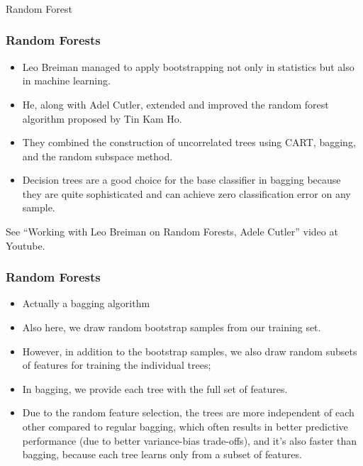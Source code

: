 \begin{frame}[fragile]\frametitle{}
\begin{center}
{\Large Random Forest}
\end{center}
\end{frame}


\begin{frame}[fragile]\frametitle{Random Forests}
\begin{itemize}
\item Leo Breiman managed to apply bootstrapping not only in statistics but also in machine learning. \item He, along with Adel Cutler, extended and improved the random forest algorithm proposed by Tin Kam Ho. 
\item They combined the construction of uncorrelated trees using CART, bagging, and the random subspace method.
\item Decision trees are a good choice for the base classifier in bagging because they are quite sophisticated and can achieve zero classification error on any sample. 

\end{itemize}

See ``Working with Leo Breiman on Random Forests, Adele Cutler'' video at Youtube.
\end{frame}



\begin{frame}[fragile]\frametitle{Random Forests}
\begin{itemize}
\item Actually a bagging algorithm
\item Also here, we draw random bootstrap samples from our training set.
\item However, in addition to the bootstrap samples, we also draw random subsets of features for training the individual trees; 
\item In bagging, we provide each tree with the full set of features. 
\item Due to the random feature selection, the trees are more independent of each other compared to regular bagging, which often results in better predictive performance (due to better variance-bias trade-offs), and it's also faster than bagging, because each tree learns only from a subset of features.

\end{itemize}
\end{frame}




